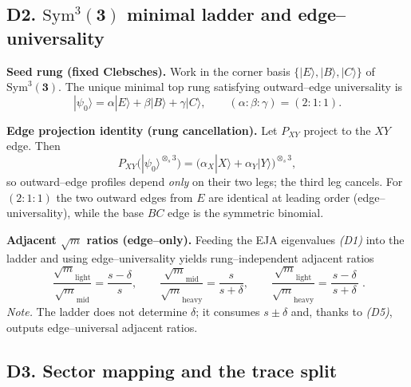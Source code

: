 \documentclass[11pt]{article}
\begin{document}
      \subsection*{D2. $\mathrm{Sym}^{3}(\mathbf{3})$ minimal ladder and edge–universality}

          \textbf{Seed rung (fixed Clebsches).}
          Work in the corner basis $\{|E\rangle,|B\rangle,|C\rangle\}$ of $\mathrm{Sym}^{3}(\mathbf{3})$. The unique minimal top rung satisfying outward–edge universality is
          \begin{equation}\tag{D4}
          |\psi_{0}\rangle=\alpha|E\rangle+\beta|B\rangle+\gamma|C\rangle,\qquad (\alpha:\beta:\gamma)=(2:1:1).
          \end{equation}

          \textbf{Edge projection identity (rung cancellation).}
          Let $P_{XY}$ project to the $XY$ edge. Then
          \begin{equation}\tag{D5}
          P_{XY}\!\big(|\psi_{0}\rangle^{\otimes_{s} 3}\big)=\big(\alpha_{X}|X\rangle+\alpha_{Y}|Y\rangle\big)^{\otimes_{s}3},
          \end{equation}
          so outward–edge profiles depend \emph{only} on their two legs; the third leg cancels. For $(2:1:1)$ the two outward edges from $E$ are identical at leading order (edge–universality), while the base $BC$ edge is the symmetric binomial.

          \textbf{Adjacent $\sqrt{m}$ ratios (edge–only).}
          Feeding the EJA eigenvalues \emph{(D1)} into the ladder and using edge–universality yields rung–independent adjacent ratios
          \begin{equation}\tag{D6}
          \boxed{\;
          \frac{\sqrt{m}_{\text{light}}}{\sqrt{m}_{\text{mid}}}=\frac{s-\delta}{s},\qquad
          \frac{\sqrt{m}_{\text{mid}}}{\sqrt{m}_{\text{heavy}}}=\frac{s}{s+\delta},\qquad
          \frac{\sqrt{m}_{\text{light}}}{\sqrt{m}_{\text{heavy}}}=\frac{s-\delta}{\,s+\delta\,}\; }.
          \end{equation}
          \textit{Note.} The ladder does not determine $\delta$; it consumes $s\pm\delta$ and, thanks to \emph{(D5)}, outputs edge–universal adjacent ratios.

      \subsection*{D3. Sector mapping and the trace split}
\end{document}
